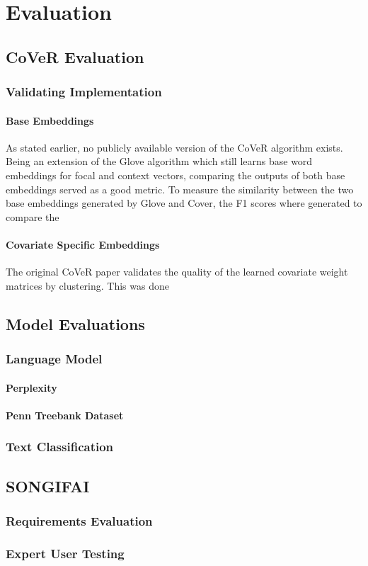 \chapter{Evaluation}
\label{chap:evaluation}
\section{CoVeR Evaluation}
\subsection{Validating Implementation}
\subsubsection{Base Embeddings}
As stated earlier, no publicly available version of the CoVeR algorithm exists. Being an extension of the Glove algorithm which still learns base word embeddings for focal and context vectors, comparing the outputs of both base embeddings served as a good metric. To measure the similarity between the two base embeddings generated by Glove and Cover, the F1 scores where generated to compare the 
\subsubsection{Covariate Specific Embeddings}
The original CoVeR paper validates the quality of the learned covariate weight matrices by clustering. This was done 
\section{Model Evaluations}
\subsection{Language Model}
\subsubsection{Perplexity}
\subsubsection{Penn Treebank Dataset}
\subsection{Text Classification}
\section{SONGIFAI}
\subsection{Requirements Evaluation}
\subsection{Expert User Testing}

